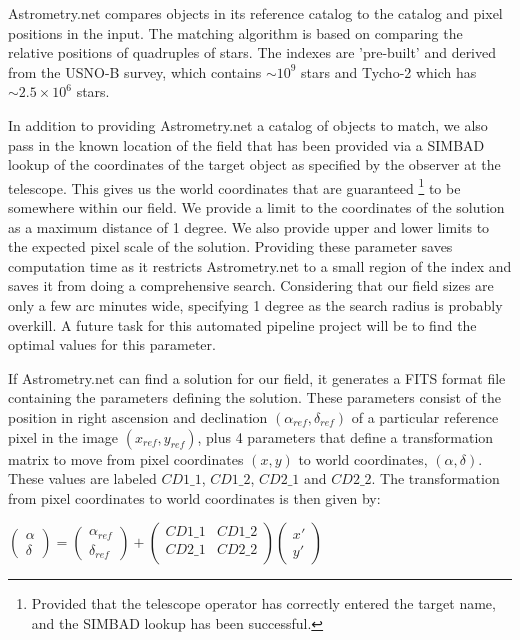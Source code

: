 Astrometry.net compares objects in its reference catalog to the catalog and pixel positions in the input. The matching algorithm is based on comparing the relative positions of quadruples of stars. The indexes are 'pre-built' and derived from the USNO-B survey, which contains $\sim10^9$ stars and Tycho-2 which has $\sim2.5\times10^6$ stars. 

In addition to providing Astrometry.net a catalog of objects to match, we also pass in the known location of the field that has been provided via a SIMBAD lookup of the coordinates of the target object as specified by the observer at the telescope. This gives us the world coordinates that are guaranteed \footnote{Provided that the telescope operator has correctly entered the target name, and the SIMBAD lookup has been successful.} to be somewhere within our field. We provide a limit to the coordinates of the solution as a maximum distance of 1 degree. We also provide upper and lower limits to the expected pixel scale of the solution. Providing these parameter saves computation time as it restricts Astrometry.net to a small region of the index and saves it from doing a comprehensive search. Considering that our field sizes are only a few arc minutes wide, specifying 1 degree as the search radius is probably overkill. A future task for this automated pipeline project will be to find the optimal values for this parameter.

If Astrometry.net can find a solution for our field, it generates a FITS format file containing the parameters defining the solution. These parameters consist of the position in right ascension and declination $(\alpha_{ref}, \delta_{ref})$ of a particular reference pixel in the image $(x_{ref}, y_{ref})$, plus 4 parameters that define a transformation matrix to move from pixel coordinates $(x, y)$ to world coordinates, $(\alpha, \delta)$. These values are labeled $CD1\_1$, $CD1\_2$, $CD2\_1$ and $CD2\_2$. The transformation from pixel coordinates to world coordinates is then given by: 

$\left(\begin{array}{c} \alpha \\ \delta \end{array} \right) = \left(\begin{array}{c} \alpha_{ref} \\ \delta_{ref} \end{array} \right) + 
\left(\begin{array}{cc}  CD1\_1 & CD1\_2 \\ CD2\_1  & CD2\_2 \\ \end{array}\right) 
\left(\begin{array}{c} x' \\ y' \end{array} \right)$

